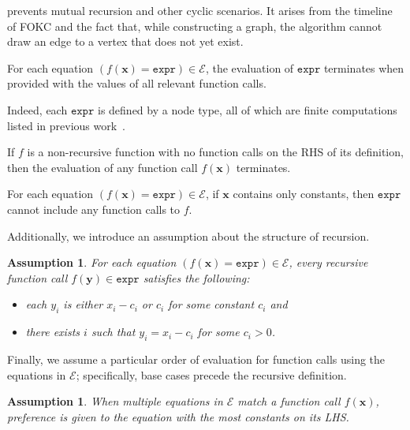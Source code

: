 \documentclass[a4paper,UKenglish,cleveref,autoref,table]{lipics-v2021}
\newcommand{\expr}{\mathtt{expr}}
\newtheorem{assumption}[theorem]{Assumption}
\begin{document}
 prevents mutual recursion and other cyclic scenarios. It
arises from the timeline of FOKC and the fact that, while constructing a graph,
the algorithm cannot draw an edge to a vertex that does not yet exist.

\begin{observation}\label{assumption3}
  For each equation $(f(\mathbf{x}) = \expr) \in \mathcal{E}$, the evaluation
  of $\expr$ terminates when provided with the values of all relevant function
  calls.
\end{observation}

Indeed, each $\expr$ is defined by a node type, all of which are finite
computations listed in previous
work~\cite{DBLP:conf/kr/DilkasB23,DBLP:conf/nips/Broeck11,DBLP:conf/ijcai/BroeckTMDR11}.

\begin{corollary}\label{fact}
  If $f$ is a non-recursive function with no function calls on the RHS of its
  definition, then the evaluation of any function call $f(\mathbf{x})$
  terminates.
\end{corollary}

\begin{observation}\label{fact2}
  For each equation $(f(\mathbf{x}) = \expr{}) \in \mathcal{E}$, if $\mathbf{x}$
  contains only constants, then $\expr{}$ cannot include any function calls to
  $f$.
\end{observation}

Additionally, we introduce an assumption about the structure of recursion.

\begin{assumption}\label{assumption4}
  For each equation $(f(\mathbf{x}) = \expr) \in \mathcal{E}$, every recursive
  function call $f(\mathbf{y}) \in \expr$ satisfies the following:
  \begin{itemize}
    \item each $y_{i}$ is either $x_{i} - c_{i}$ or $c_{i}$ for some constant
          $c_{i}$ and
    \item there exists $i$ such that $y_{i} = x_{i} - c_{i}$ for some
          $c_{i} > 0$.
  \end{itemize}
\end{assumption}

Finally, we assume a particular order of evaluation for function calls using the
equations in $\mathcal{E}$; specifically, base cases precede the recursive
definition.

\begin{assumption}
  When multiple equations in $\mathcal{E}$ match a function call
  $f(\mathbf{x})$, preference is given to the equation with the most constants
  on its LHS.
\end{assumption}
\end{document}
